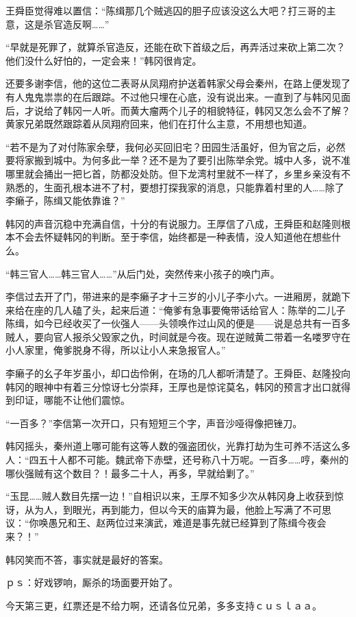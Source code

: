王舜臣觉得难以置信：“陈缉那几个贼逃囚的胆子应该没这么大吧？打三哥的主意，这是杀官造反啊……”

“早就是死罪了，就算杀官造反，还能在砍下首级之后，再弄活过来砍上第二次？他们没什么好怕的，一定会来！”韩冈很肯定。

还要多谢李信，他的这位二表哥从凤翔府护送着韩家父母会秦州，在路上便发现了有人鬼鬼祟祟的在后跟踪。不过他只埋在心底，没有说出来。一直到了与韩冈见面后，才说给了韩冈一人听。而黄大瘤两个儿子的相貌特征，韩冈又怎么会不了解？黄家兄弟既然跟踪着从凤翔府回来，他们在打什么主意，不用想也知道。

“若不是为了对付陈家余孽，我何必买回旧宅？田园生活虽好，但为官之后，必然要将家搬到城中。为何多此一举？还不是为了要引出陈举余党。城中人多，说不准哪里就会捅出一把匕首，防都没处防。但下龙湾村里就不一样了，乡里乡亲没有不熟悉的，生面孔根本进不了村，要想打探我家的消息，只能靠着村里的人……除了李癞子，陈缉又能依靠谁？”

韩冈的声音沉稳中充满自信，十分的有说服力。王厚信了八成，王舜臣和赵隆则根本不会去怀疑韩冈的判断。至于李信，始终都是一种表情，没人知道他在想些什么。

“韩三官人……韩三官人……”从后门处，突然传来小孩子的唤门声。

李信过去开了门，带进来的是李癞子才十三岁的小儿子李小六。一进厢房，就跪下来给在座的几人磕了头，起来后道：“俺爹有急事要俺带话给官人：陈举的二儿子陈缉，如今已经收买了一伙强人——头领唤作过山风的便是——说是总共有一百多贼人，要向官人报杀父毁家之仇，时间就是今夜。现在逆贼黄二带着一名喽罗守在小人家里，俺爹脱身不得，所以让小人来急报官人。”

李癞子的幺子年岁虽小，却口齿伶俐，在场的几人都听清楚了。王舜臣、赵隆投向韩冈的眼神中有着三分惊讶七分崇拜，王厚也是惊诧莫名，韩冈的预言才出口就得到印证，哪能不让他们震惊。

“一百多？”李信第一次开口，只有短短三个字，声音沙哑得像把锉刀。

韩冈摇头，秦州道上哪可能有这等人数的强盗团伙，光靠打劫为生可养不活这么多人：“四五十人都不可能。魏武帝下赤壁，还号称八十万呢。一百多……哼，秦州的哪伙强贼有这个数目？！最多二十人，再多，早就给剿了。”

“玉昆……贼人数目先摆一边！”自相识以来，王厚不知多少次从韩冈身上收获到惊讶，从为人，到眼光，再到能力，但以今天的庙算为最，他脸上写满了不可思议：“你唤愚兄和王、赵两位过来演武，难道是事先就已经算到了陈缉今夜会来？！”

韩冈笑而不答，事实就是最好的答案。

ｐｓ：好戏锣响，厮杀的场面要开始了。

今天第三更，红票还是不给力啊，还请各位兄弟，多多支持ｃｕｓｌａａ。

